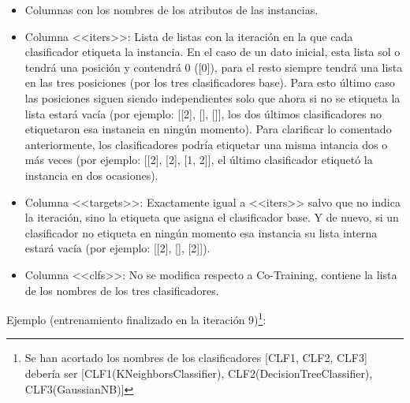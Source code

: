 \begin{itemize}
    \item Columnas con los nombres de los atributos de las instancias.
    \item Columna <<iters>>: Lista de listas con la iteración en la que cada
    clasificador etiqueta la instancia. En el caso de un dato inicial, esta
    lista sol o tendrá una posición y contendrá 0 ([0]), para el resto siempre
    tendrá una lista en las tres posiciones (por los tres clasificadores base).
    Para esto último caso las posiciones siguen siendo independientes solo que
    ahora si no se etiqueta la lista estará vacía (por ejemplo: [[2], [], []],
    los dos últimos clasificadores no etiquetaron esa instancia en ningún
    momento). Para clarificar lo comentado anteriormente, los clasificadores
    podría etiquetar una misma intancia dos o más veces (por ejemplo: [[2], [2],
    [1, 2]], el último clasificador etiquetó la instancia en dos ocasiones).
    \item Columna <<targets>>: Exactamente igual a <<iters>> salvo que no indica
    la iteración, sino la etiqueta que asigna el clasificador base. Y de nuevo,
    si un clasificador no etiqueta en ningún momento esa instancia su lista
    interna estará vacía (por ejemplo: [[2], [], [2]]).
    \item Columna <<clfs>>: No se modifica respecto a Co-Training, contiene la
    lista de los nombres de los tres clasificadores.
\end{itemize}

Ejemplo (entrenamiento finalizado en la iteración 9)\footnote{Se han acortado los nombres de los clasificadores [CLF1, CLF2, CLF3]
debería ser [CLF1(KNeighborsClassifier), CLF2(DecisionTreeClassifier),
CLF3(GaussianNB)]}:
\begin{table}[H]
    \caption{Ejemplo de DataFrame de Tri-Training}
\end{table}

